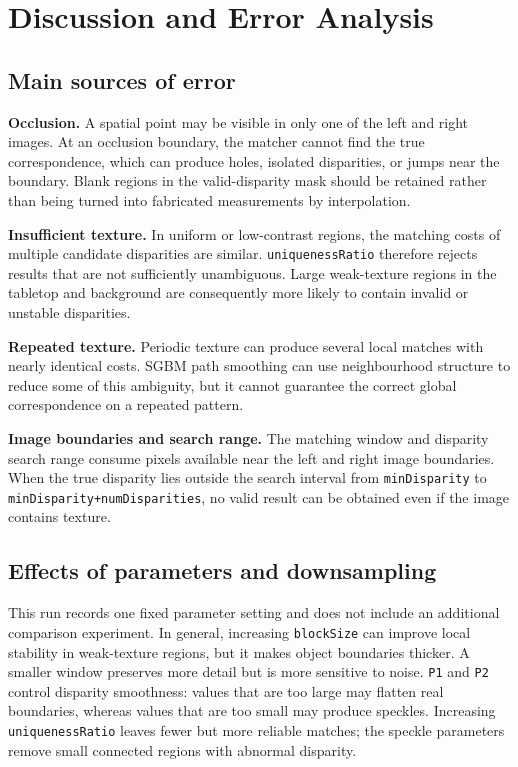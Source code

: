 \section{Discussion and Error Analysis}

\subsection{Main sources of error}

\textbf{Occlusion.} A spatial point may be visible in only one of the left and right images. At an occlusion boundary, the matcher cannot find the true correspondence, which can produce holes, isolated disparities, or jumps near the boundary. Blank regions in the valid-disparity mask should be retained rather than being turned into fabricated measurements by interpolation.

\textbf{Insufficient texture.} In uniform or low-contrast regions, the matching costs of multiple candidate disparities are similar. \texttt{uniquenessRatio} therefore rejects results that are not sufficiently unambiguous. Large weak-texture regions in the tabletop and background are consequently more likely to contain invalid or unstable disparities.

\textbf{Repeated texture.} Periodic texture can produce several local matches with nearly identical costs. SGBM path smoothing can use neighbourhood structure to reduce some of this ambiguity, but it cannot guarantee the correct global correspondence on a repeated pattern.

\textbf{Image boundaries and search range.} The matching window and disparity search range consume pixels available near the left and right image boundaries. When the true disparity lies outside the search interval from \texttt{minDisparity} to \texttt{minDisparity+numDisparities}, no valid result can be obtained even if the image contains texture.

\subsection{Effects of parameters and downsampling}

This run records one fixed parameter setting and does not include an additional comparison experiment. In general, increasing \texttt{blockSize} can improve local stability in weak-texture regions, but it makes object boundaries thicker. A smaller window preserves more detail but is more sensitive to noise. \texttt{P1} and \texttt{P2} control disparity smoothness: values that are too large may flatten real boundaries, whereas values that are too small may produce speckles. Increasing \texttt{uniquenessRatio} leaves fewer but more reliable matches; the speckle parameters remove small connected regions with abnormal disparity.

